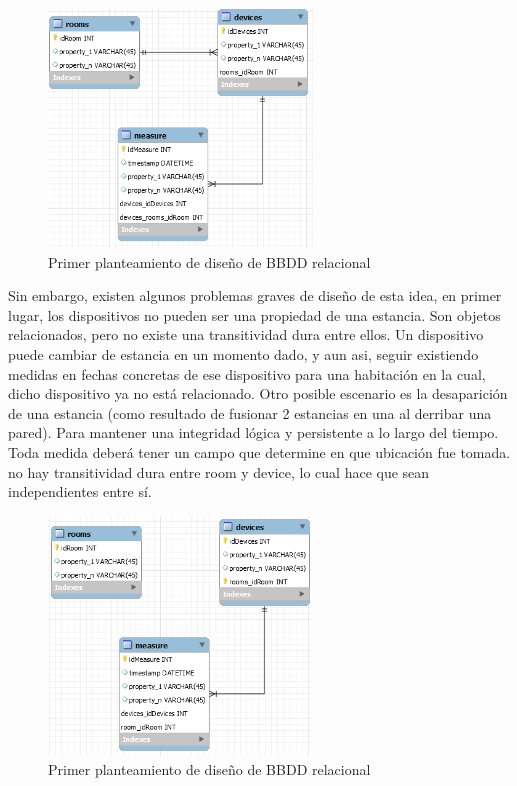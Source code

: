 \begin{figure}[hbt!]
\centering
\includegraphics[height=2.5in]{figures/SQLSchemaExample_1.png}
\caption[Primer planteamiento de diseño de BBDD relacional]{Primer planteamiento de diseño de BBDD relacional\footnotemark}
\end{figure}

\vspace{1.5cm}

Sin embargo, existen algunos problemas graves de diseño de esta idea, en primer lugar, los dispositivos no pueden ser una propiedad de una estancia. Son objetos relacionados, pero no existe una transitividad dura entre ellos. Un dispositivo puede cambiar de estancia en un momento dado, y aun asi, seguir existiendo medidas en fechas concretas de ese dispositivo para una habitación en la cual, dicho dispositivo ya no está relacionado. Otro posible escenario es la desaparición de una estancia (como resultado de fusionar 2 estancias en una al derribar una pared). Para mantener una integridad lógica y persistente a lo largo del tiempo. Toda medida deberá tener un campo que determine en que ubicación fue tomada.
no hay transitividad dura entre room y device, lo cual hace que sean independientes entre sí.


\begin{figure}[hbt!]
\centering
\includegraphics[height=2.5in]{figures/SQLSchemaExample_2.png}
\caption[Segundo planteamiento de diseño de BBDD relacional]{Primer planteamiento de diseño de BBDD relacional\footnotemark}
\end{figure}

